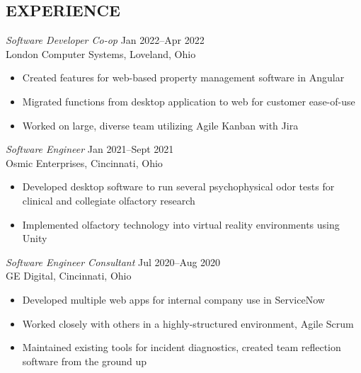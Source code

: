 \documentclass[margin]{res} %
\begin{document}
\begin{resume}
\vspace*{-5mm}
 
 
\section{EXPERIENCE}

{\sl Software Developer Co-op} \hfill {\color{black} Jan 2022–Apr 2022}  \\
London Computer Systems, Loveland, Ohio 
\begin{itemize} \itemsep -2pt %
\item Created features for web-based property management software in Angular
\item Migrated functions from desktop application to web for customer ease-of-use
\item Worked on large, diverse team utilizing Agile Kanban with Jira
\end{itemize}

{\sl Software Engineer} \hfill {\color{black} Jan 2021–Sept 2021}  \\
Osmic Enterprises, Cincinnati, Ohio 
\begin{itemize} \itemsep -2pt %
\item Developed desktop software to run several psychophysical odor tests for clinical and collegiate olfactory research
\item Implemented olfactory technology into virtual reality environments using Unity
\end{itemize}

 
{\sl Software Engineer Consultant} \hfill {\color{black} Jul 2020–Aug 2020} \\
GE Digital, Cincinnati, Ohio
\begin{itemize} \itemsep -2pt %
\item Developed multiple web apps for internal company use in ServiceNow
\item Worked closely with others in a highly-structured environment, Agile Scrum
\item Maintained existing tools for incident diagnostics, created team reflection software from the ground up
\end{itemize} 


\end{resume}
\end{document}
